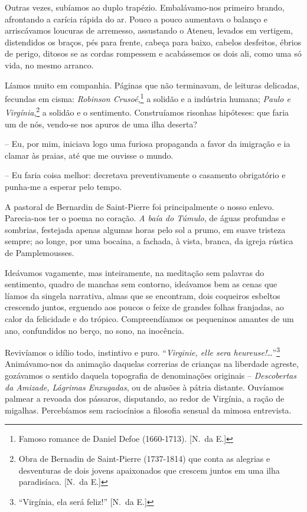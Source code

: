 Outras vezes, subíamos ao duplo
trapézio. Embalávamo{}-nos primeiro brando, afrontando a carícia rápida
do ar. Pouco a pouco aumentava o balanço e arriscávamos loucuras de
arremesso, assustando o Ateneu, levados em vertigem, distendidos os
braços, pés para frente, cabeça para baixo, cabelos desfeitos, ébrios
de perigo, ditosos se as cordas rompessem e acabássemos os dois ali,
como uma só vida, no mesmo arranco. 

Líamos muito em companhia. Páginas
que não terminavam, de leituras delicadas, fecundas em cisma: \textit{Robinson
Crusoé},\footnote{ Famoso romance de Daniel Defoe (1660{}-1713). [N.~da E.]} a solidão 
e a indústria humana; \textit{Paulo e Virgínia},\footnote{ Obra de Bernadin 
de Saint{}-Pierre (1737{}-1814) que conta as alegrias e desventuras de dois 
jovens apaixonados que crescem juntos em uma ilha paradisíaca. [N.~da E.]} a solidão e o
sentimento. Construíamos risonhas hipóteses: que faria um de nós,
vendo{}-se nos apuros de uma ilha deserta? 

-- Eu, por mim, iniciava logo uma furiosa propaganda a favor 
da imigração e ia clamar às praias, até que me ouvisse o mundo. 

-- Eu faria coisa melhor: decretava preventivamente o casamento 
obrigatório e punha{}-me a esperar pelo tempo. 

A pastoral de Bernardin de Saint{}-Pierre foi principalmente o
nosso enlevo. Parecia{}-nos ter o poema no coração. \textit{A baía do Túmulo},
de águas profundas e sombrias, festejada apenas algumas horas pelo sol
a prumo, em suave tristeza sempre; ao longe, por uma bocaina, a
fachada, à vista, branca, da igreja rústica de Pamplemousses. 

Ideávamos vagamente, mas inteiramente, na meditação sem palavras do sentimento,
quadro de manchas sem contorno, ideávamos bem as cenas que líamos da singela
narrativa, almas que se encontram, dois coqueiros esbeltos crescendo
juntos, erguendo aos poucos o feixe de grandes folhas franjadas, ao
calor da felicidade e do trópico. Compreendíamos os pequeninos amantes
de um ano, confundidos no berço, no sono, na inocência. 

Revivíamos o idílio todo, instintivo e puro. ``\textit{Virginie, elle sera heureuse!}\ldots''\footnote{ ``Virgínia, 
ela será feliz!'' [N.~da E.]} Animávamo{}-nos da animação daquelas correrias de crianças na liberdade
agreste, gozávamos o sentido daquela topografia de denominações
originais -- \textit{Descobertas da Amizade, Lágrimas Enxugadas}, ou de alusões
à pátria distante. Ouvíamos palmear a revoada dos pássaros, disputando,
ao redor de Virgínia, a ração de migalhas. Percebíamos sem raciocínios
a filosofia sensual da mimosa entrevista.

